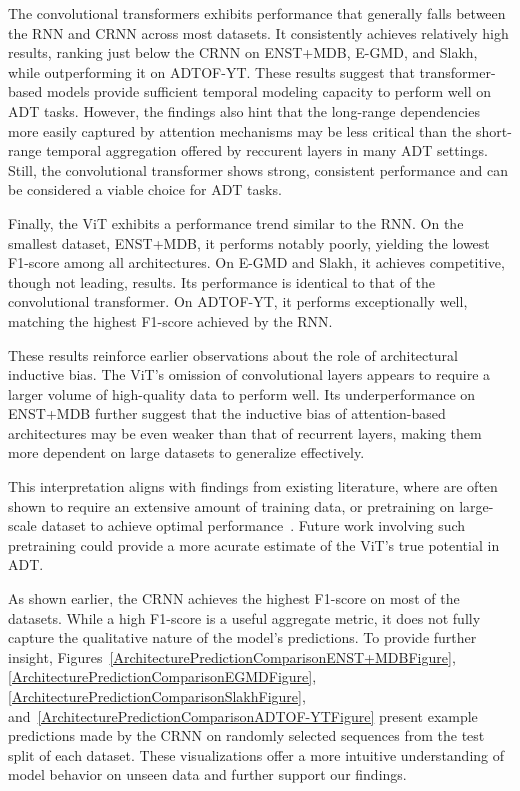 The convolutional transformers exhibits performance that generally falls between the \gls{RNN} and \gls{CRNN} across most datasets. It consistently achieves relatively high results, ranking just below the \gls{CRNN} on ENST+MDB, E-GMD, and Slakh, while outperforming it on ADTOF-YT. These results suggest that transformer-based models provide sufficient temporal modeling capacity to perform well on \gls{ADT} tasks. However, the findings also hint that the long-range dependencies more easily captured by attention mechanisms may be less critical than the short-range temporal aggregation offered by reccurent layers in many \gls{ADT} settings. Still, the convolutional transformer shows strong, consistent performance and can be considered a viable choice for \gls{ADT} tasks.

Finally, the \acrfull{ViT} exhibits a performance trend similar to the \gls{RNN}. On the smallest dataset, ENST+MDB, it performs notably poorly, yielding the lowest F1-score among all architectures. On E-GMD and Slakh, it achieves competitive, though not leading, results. Its performance is identical to that of the convolutional transformer. On ADTOF-YT, it performs exceptionally well, matching the highest F1-score achieved by the \gls{RNN}. 

These results reinforce earlier observations about the role of architectural inductive bias. The \gls{ViT}'s omission of convolutional layers appears to require a larger volume of high-quality data to perform well. Its underperformance on ENST+MDB further suggest that the inductive bias of attention-based architectures may be even weaker than that of recurrent layers, making them more dependent on large datasets to generalize effectively. 

This interpretation aligns with findings from existing literature, where  are often shown to require an extensive amount of training data, or pretraining on large-scale dataset to achieve optimal performance~\cite{dosovitskiy2021imageworth16x16words}. Future work involving such pretraining could provide a more acurate estimate of the \gls{ViT}'s true potential in \gls{ADT}.

As shown earlier, the \acrfull{CRNN} achieves the highest F1-score on most of the datasets. While a high F1-score is a useful aggregate metric, it does not fully capture the qualitative nature of the model's predictions. To provide further insight, Figures~\ref{ArchitecturePredictionComparisonENST+MDBFigure}, \ref{ArchitecturePredictionComparisonEGMDFigure}, \ref{ArchitecturePredictionComparisonSlakhFigure}, and~\ref{ArchitecturePredictionComparisonADTOF-YTFigure} present example predictions made by the \gls{CRNN} on randomly selected sequences from the test split of each dataset. These visualizations offer a more intuitive understanding of model behavior on unseen data and further support our findings.

